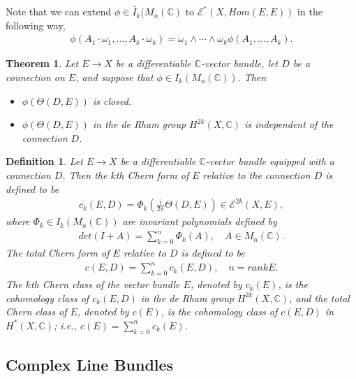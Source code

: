 \documentclass[a4paper,10pt]{amsart}
\newtheorem{theorem}{Theorem}[section]
\newtheorem{definition}{Definition}[section]
\newcommand{\C}{\mathbb C} %
\newcommand{\E}{\mathcal E}
\begin{document}
Note that we can extend $\phi \in \widetilde{I_{k}}(M_{n}(\C)$ to 
$\E^{*}(X, Hom(E, E))$ in the following way,
\begin{align*}
    \phi(A_{1}\cdot \omega_{1}, \ldots, A_{k}\cdot \omega_{k})
    = \omega_{1} \wedge \cdots \wedge \omega_{k} \phi(A_{1}, \ldots,
    A_{k}).
\end{align*}

\begin{theorem}
   Let $E \rightarrow X$ be a differentiable $\C$-vector bundle, let
   $D$ be a connection on $E$, and suppose that $\phi \in I_{k}(M_{n}(\C))$.
   Then
   \begin{itemize}
       \item $\phi(\Theta(D, E))$ is closed.
        \item $\phi(\Theta(D, E))$ in the de Rham group $H^{2k}(X, \C)$ 
            is independent of the connection $D$.
   \end{itemize}
\end{theorem}

\begin{definition}
   Let $E \rightarrow X$ be a differentiable $\C$-vector bundle
   equipped with a connection $D$. Then the $k$th Chern form of $E$
   relative to the connection $D$ is defined to be 
   \begin{align*}
       c_{k}(E, D) = \Phi_{k}(\frac{i}{2\pi}\Theta(D, E)) \in 
       \E^{2k}(X, E),
   \end{align*}
   where $\Phi_{k} \in I_{k}(M_{n}(\C))$ are invariant polynomials 
   defined by 
   \begin{align*}
       det(I+A) = \sum_{k=0}^{n}\Phi_{k}(A), \quad A \in M_{n}(\C). 
   \end{align*}
  The total Chern form of $E$ relative to $D$ is defined to be 
  \begin{align*}
      c(E, D) = \sum^{n}_{k=0}c_{k}(E,D), \quad n = rank E. 
  \end{align*}
  The $k$th Chern class of the vector bundle $E$, denoted by $c_{k}(E)$,
  is the cohomology class of $c_{k}(E, D)$ in the de Rham group
  $H^{2k}(X, \C)$, and the total Chern class of $E$, denoted by $c(E)$,
  is the cohomology class of $c(E,D)$ in $H^{*}(X, \C)$;
  i.e., $c(E) = \sum^{n}_{k=0}c_{k}(E)$.
\end{definition}

\subsection{Complex Line Bundles}
\end{document}
